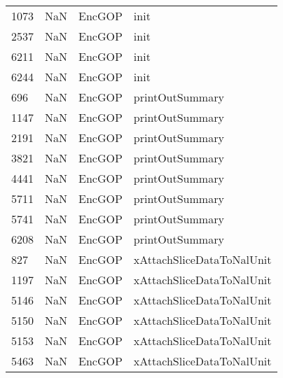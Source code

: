 \begin{tabular}{llll}
1073 &                   NaN &                     EncGOP &                                      init \\
2537 &                   NaN &                     EncGOP &                                      init \\
6211 &                   NaN &                     EncGOP &                                      init \\
6244 &                   NaN &                     EncGOP &                                      init \\
696  &                   NaN &                     EncGOP &                           printOutSummary \\
1147 &                   NaN &                     EncGOP &                           printOutSummary \\
2191 &                   NaN &                     EncGOP &                           printOutSummary \\
3821 &                   NaN &                     EncGOP &                           printOutSummary \\
4441 &                   NaN &                     EncGOP &                           printOutSummary \\
5711 &                   NaN &                     EncGOP &                           printOutSummary \\
5741 &                   NaN &                     EncGOP &                           printOutSummary \\
6208 &                   NaN &                     EncGOP &                           printOutSummary \\
827  &                   NaN &                     EncGOP &                 xAttachSliceDataToNalUnit \\
1197 &                   NaN &                     EncGOP &                 xAttachSliceDataToNalUnit \\
5146 &                   NaN &                     EncGOP &                 xAttachSliceDataToNalUnit \\
5150 &                   NaN &                     EncGOP &                 xAttachSliceDataToNalUnit \\
5153 &                   NaN &                     EncGOP &                 xAttachSliceDataToNalUnit \\
5463 &                   NaN &                     EncGOP &                 xAttachSliceDataToNalUnit \\

\end{tabular}
